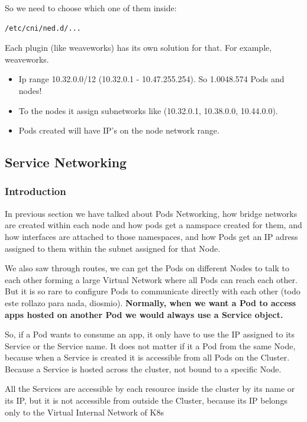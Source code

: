 \documentclass{article}
\newenvironment{blocktemplateIII}[1]{%
    \tcolorbox[beamer,%
    noparskip,breakable,
    ,colframe=Red,%
    colbacklower=LimeGreen!75!LightGreen,%
    title=#1]}%
    {\endtcolorbox}
\newenvironment{codetemplate}[1][]{%
  \mybasecolorbox[#1]
  \itshape
}{%
  \endmybasecolorbox
}
\begin{document}
So we need to choose which one of them inside:
\begin{codetemplate}{}
\begin{verbatim}
/etc/cni/ned.d/...
\end{verbatim}
\end{codetemplate}

Each plugin (like weaveworks) has its own solution for that. For example, weaveworks.
\begin{itemize}
    \item Ip range 10.32.0.0/12 (10.32.0.1 - 10.47.255.254). So 1.0048.574 Pods and nodes!
    \item To the nodes it assign subnetworks like (10.32.0.1, 10.38.0.0, 10.44.0.0).
    \item Pods created will have IP's on the node network range.
\end{itemize}

\subsection{Service Networking}

\subsubsection{Introduction}
In previous section we have talked about Pods Networking, how bridge networks are created within each node and how pods get a namspace created for them, and how interfaces are attached to those namespaces, and how Pods get an IP adress assigned to them within the subnet assigned for that Node.

We also saw through routes, we can get the Pods on different Nodes to talk to each other forming a large Virtual Network where all Pods can reach each other. But it is so rare to configure Pods to communicate directly with each other (todo este rollazo para nada, diosmio). \textbf{Normally, when we want a Pod to access apps hosted on another Pod we would always use a Service object.}

So, if a Pod wants to consume an app, it only have to use the IP assigned to its Service or the Service name. It does not matter if it a Pod from the same Node, because when a Service is created it is accessible from all Pods on the Cluster. Because a Service is hosted across the cluster, not bound to a specific Node. 

\begin{blocktemplateIII}{WARNING}
All the Services are accessible by each resource inside the cluster by its name or its IP, but it is not accessible from outside the Cluster, because its IP belongs only to the Virtual Internal Network of K8s    
\end{blocktemplateIII}
\end{document}
